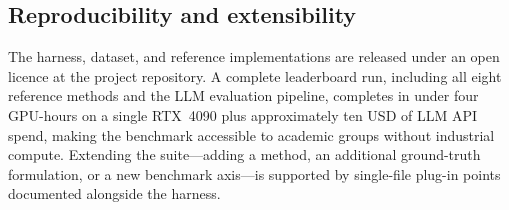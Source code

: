 \subsection{Reproducibility and extensibility}

The harness, dataset, and reference implementations are released
under an open licence at the project repository.  A complete
leaderboard run, including all eight reference methods and the LLM
evaluation pipeline, completes in under four GPU-hours on a single
RTX~4090 plus approximately ten USD of LLM API spend, making the
benchmark accessible to academic groups without industrial compute.
Extending the suite---adding a method, an additional ground-truth
formulation, or a new benchmark axis---is supported by single-file
plug-in points documented alongside the harness.
